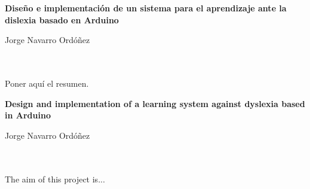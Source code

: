 \chapter*{}






\cleardoublepage
\thispagestyle{empty}

\begin{center}
{\large\bfseries Diseño e implementación de un sistema para el aprendizaje ante la dislexia basado en Arduino}\\
\end{center}
\begin{center}
Jorge Navarro Ordóñez\\
\end{center}

\\

\vspace{0.7cm}
\\

Poner aquí el resumen.
\cleardoublepage


\thispagestyle{empty}


\begin{center}
{\large\bfseries Design and implementation of a learning system against dyslexia based in Arduino}\\
\end{center}
\begin{center}
Jorge Navarro Ordóñez\\
\end{center}

\\

\vspace{0.7cm}
\\

The aim of this project is...

\chapter*{}
\thispagestyle{empty}


